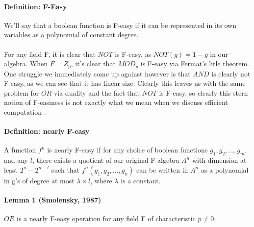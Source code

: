 \documentclass{article}
\begin{document}
\paragraph*{Definition: F-Easy} 
  We'll say that a boolean function is F-easy if it can be represented in its own variables as a
polynomial of constant degree.

\paragraph*{}
  For any field F, it is clear that $NOT$ is F-easy, as $NOT(g) = 1 - g$ in our algebra. When 
$F = Z_p$, it's clear that $MOD_p$ is F-easy via Fermat's litle theorem. One struggle we
immediately come up against however is that $AND$ is clearly not F-easy, as we can see that
it has linear size. Clearly this leaves us with the same problem for $OR$ via duality and the
fact that $NOT$ is F-easy, so clearly this stern notion of F-easiness is not exactly what we
mean when we discuss efficient computation \cite{Smolensky1987}.

\paragraph*{Definition: nearly F-easy}
  A function $f^n$ is nearly F-easy if for any choice of boolean functions $g_1, g_2, ..., g_m$,
and any $l$, there exists a quotient of our original F-algebra $A^n$ with dimension at least 
$2^n - 2^{n - l}$ such that $f^n(g_1, g_2, ..., g_n)$ can be written in $A^n$ as a polynomial
in g's of degree at most $\lambda \times l$, where $\lambda$ is a constant.

\paragraph*{Lemma 1 (Smolensky, 1987)}
  $OR$ is a nearly F-easy operation for any field F of characteristic $p \neq 0$.
\end{document}
